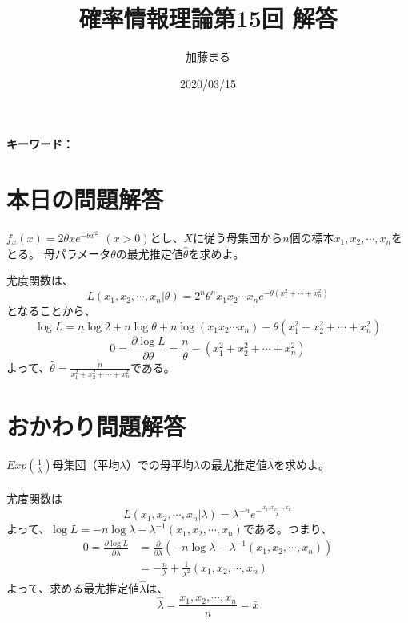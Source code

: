 \documentclass[a4j,uplatex,dvipdfmx]{jsarticle}
\title{確率情報理論第15回 解答}
\author{加藤まる}
\date{2020/03/15}
\begin{document}
\maketitle
\bf キーワード：
\rm

\section*{本日の問題解答}
$f_x(x)=2\theta x e^{-\theta x^2}~~(x>0)$とし、$X$に従う母集団から$n$個の標本$x_1,x_2,\cdots , x_n$をとる。
母パラメータ$\theta$の最尤推定値$\hat{\theta}$を求めよ。

尤度関数は、
\begin{equation}
  L(x_1,x_2,\cdots, x_n|\theta)=2^n\theta^n x_1  x_2\cdots x_n e^{-\theta(x_1^2+\cdots+x_n^2)}
\end{equation}
となることから、
\begin{equation}
    \log{L}= n\log{2}+n\log{\theta} + n\log(x_1x_2\cdots x_n)-\theta(x_1^2+x_2^2+\cdots+x_n^2)
\end{equation}
\begin{equation}
  0=\frac{\partial \log{L}}{\partial \theta}=\frac{n}{\theta}-(x_1^2+x_2^2+\cdots+x_n^2)
\end{equation}
よって、$\displaystyle \hat{\theta}=\frac{n}{x_1^2+x_2^2+\cdots+x_n^2}$である。


\section*{おかわり問題解答}
$Exp(\frac{1}{\lambda})$母集団（平均$\lambda$）での母平均$\lambda$の最尤推定値$\hat{\lambda}$を求めよ。
\\ \\ 
尤度関数は
\begin{equation}
  L(x_1,x_2,\cdots, x_n|\lambda) = \lambda^{-n}e^{-\frac{x_1,x_2,\cdots, x_n}{\lambda}}
\end{equation}
よって、$\log{L}=-n\log{\lambda}-\lambda^{-1}(x_1,x_2,\cdots, x_n)$である。つまり、
\begin{equation}
  \begin{split}
    0=\frac{\partial \log{L}}{\partial \lambda}&=\frac{\partial}{\partial \lambda}(-n\log{\lambda}-\lambda^{-1}(x_1,x_2,\cdots, x_n)) \\
    &=-\frac{n}{\lambda}+\frac{1}{\lambda^2}(x_1,x_2,\cdots, x_n)
  \end{split}
\end{equation}
よって、求める最尤推定値$\hat{\lambda}$は、
\begin{equation}
  \hat{\lambda}=\frac{x_1,x_2,\cdots, x_n}{n}=\bar{x}
\end{equation}
\end{document}
